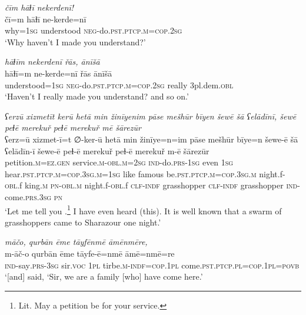 \ea \label{HB.92}
\textit{čīm hāɫī nekerdenī!} \\ 
\gll čī=m hāɫī ne-kerde=nī \\ 
 why\textsc{=1sg} understood \textsc{neg-}do\textsc{.pst}\textsc{.ptcp}\textsc{.m}\textsc{=cop}\textsc{.\textsc{2sg}} \\ 
\glt `Why haven’t I made you understand?'
\z 
 
\ea \label{HB.93}
\textit{hāɫīm nekerdenī řās, ānīšā} \\ 
\gll hāɫī=m ne-kerde=nī řās ānīšā \\ 
 understood\textsc{=1sg} \textsc{neg-}do\textsc{.pst}\textsc{.ptcp}\textsc{.m}\textsc{=cop}\textsc{.\textsc{2sg}} really 3pl.dem\textsc{.obl} \\ 
\glt `Haven’t I really made you understand? and so on.'
\z 


\ea \label{PM.1}
\textit{ʕerzū xizmetīt kerū hetā min žinīyenim pāse mešhūr bīyen šewē šā ʕelādīnī, šewē peɫē merekuř peɫē merekuř mē šārezūr} \\ 
\gll ʕerz=ū xizmet-ī=t ∅-ker-ū hetā min žinīye=n=im pāse mešhūr bīye=n šewe-ē šā ʕelādīn-ī šewe-ē peɫ-ē merekuř peɫ-ē merekuř m-ē šārezūr \\ 
 petition\textsc{.m}\textsc{\textsc{=ez.gen}} service\textsc{.m}\textsc{-obl}\textsc{.m}\textsc{=\textsc{2sg}} \textsc{ind-}do\textsc{.prs}\textsc{-\textsc{1sg}} even \textsc{1sg} hear\textsc{.pst}\textsc{.ptcp}\textsc{.m}\textsc{=cop}\textsc{.3sg}\textsc{.m}\textsc{=\textsc{1sg}} like famous be\textsc{.pst}\textsc{.ptcp}\textsc{.m}\textsc{=cop}\textsc{.3sg}\textsc{.m} night.f\textsc{-obl}.f king\textsc{.m} \textsc{pn}\textsc{-obl}\textsc{.m} night.f\textsc{-obl}.f \textsc{clf}\textsc{-indf} grasshopper \textsc{clf}\textsc{-indf} grasshopper \textsc{ind-}come\textsc{.prs}\textsc{.3sg} \textsc{pn} \\ 
\glt `Let me tell you .\footnote{Lit. May a petition be for your service.} I have even heard (this). It is well known that a swarm of grasshoppers came to Sharazour one night.'
\z 
 
\ea \label{PM.11}
\textit{māčo, qurbān ēme tāyfēnmē āmēnmēre,} \\ 
\gll m-āč-o qurbān ēme tāyfe-ē=nmē āmē=nmē=re \\ 
 \textsc{ind-}say\textsc{.prs}\textsc{-3sg} sir.\textsc{voc} \textsc{1pl} tirbe\textsc{.m}\textsc{-indf}\textsc{=cop}\textsc{.1pl} come\textsc{.pst}\textsc{.ptcp}\textsc{.pl}\textsc{=cop}\textsc{.1pl}\textsc{=\textsc{povb}} \\ 
\glt `[and] said, ‘Sir, we are a family [who] have come here.'
\z 
 
